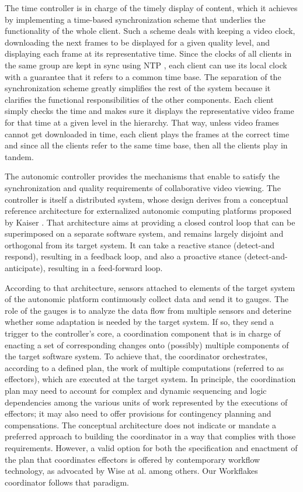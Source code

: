 \documentclass{sig-alternate}
\begin{document}
The time controller is in charge of the timely display of content,
which it achieves by implementing a time-based synchronization scheme
that underlies the functionality of the whole client.  Such a scheme
deals with keeping a video clock, downloading the next frames to be
displayed for a given quality level, and displaying each frame at its
representative time.  Since the clocks of all clients in the same
group are kept in sync using NTP \cite{NTP}, each client can use its
local clock with a guarantee that it refers to a common time base.
The separation of the synchronization scheme greatly simplifies the
rest of the system because it clarifies the functional
responsibilities of the other components.  Each client simply checks
the time and makes sure it displays the representative video frame for
that time at a given level in the hierarchy.  That way, unless video
frames cannot get downloaded in time, each client plays the frames at
the correct time and since all the clients refer to the same time
base, then all the clients play in tandem.

The autonomic controller provides the mechanisms that enable to
satisfy the synchronization and quality requirements of collaborative
video viewing.  The controller is itself a distributed system, whose
design derives from a conceptual reference architecture for
externalized autonomic computing platforms proposed by Kaiser
\cite{refarch}.
%
%
That architecture aims at providing a closed control loop that can be
superimposed on a separate software system, and remains largely
disjoint and orthogonal from its target system. It can take a reactive
stance (detect-and respond), resulting in a feedback loop, and also a
proactive stance (detect-and-anticipate), resulting in a feed-forward
loop.

According to that architecture, sensors attached to elements of the
target system of the autonomic platform continuously collect data and
send it to gauges.  The role of the gauges is to analyze the data flow
from multiple sensors and deterine whether some adaptation is needed
by the target system.  If so, they send a trigger to the controller's
core, a coordination component that is in charge of enacting a set of
corresponding changes onto (possibly) multiple components of the
target software system.  To achieve that, the coordinator
orchestrates, according to a defined plan, the work of multiple
computations (referred to as effectors), which are executed at the
target system.  In principle, the coordination plan may need to
account for complex and dynamic sequencing and logic dependencies
among the various units of work represented by the executions of
effectors; it may also need to offer provisions for contingency
planning and compensations. The conceptual architecture does not
indicate or mandate a preferred approach to building the coordinator
in a way that complies with those requirements.  However, a valid
option for both the specification and enactment of the plan that
coordinates effectors is offered by contemporary workflow technology,
as advocated by Wise at al. \cite{OSTERWEIL} among others.  Our
Workflakes coordinator follows that paradigm.
\end{document}
